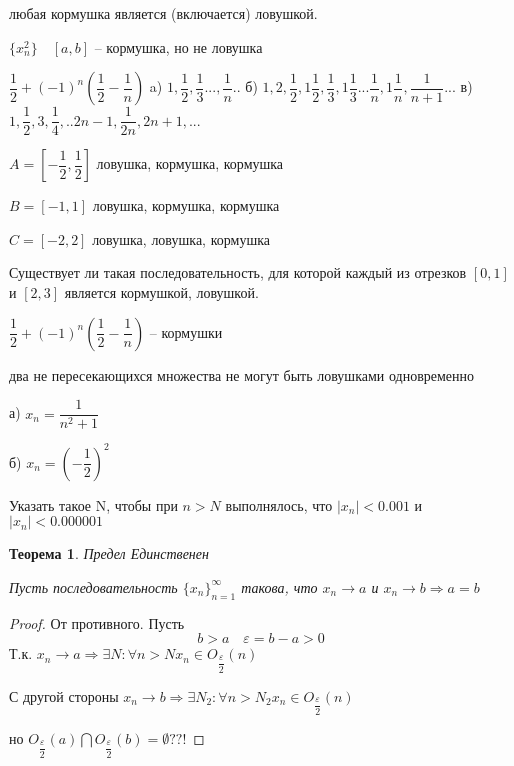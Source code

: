 \documentclass{book}
\newtheorem{Th}{Теорема}[chapter]
\begin{document}
любая кормушка является (включается) ловушкой.

$\{x_n^2\}\quad [a, b]$ -- кормушка, но не ловушка

\noindent
$\dfrac{1}{2} + (-1)^n(\dfrac{1}{2}-\dfrac{1}{n})$
\newline
\newline
a) $1, \dfrac{1}{2}, \dfrac{1}{3} ..., \dfrac{1}{n}	..$
\newline
\newline
б) $1, 2, \dfrac{1}{2}, 1\dfrac{1}{2}, \dfrac{1}{3}, 1\dfrac{1}{3} ... \dfrac{1}{n}, 1\dfrac{1}{n}, \dfrac{1}{n+1}...$
\newline
\newline
в) $1, \dfrac{1}{2}, 3, \dfrac{1}{4}, .. 2n-1, \dfrac{1}{2n}, 2n+1, ...$
\newline
\newline

$A = [-\dfrac{1}{2}, \dfrac{1}{2}]$ ловушка, кормушка, кормушка

$B = [-1, 1]$ ловушка, кормушка, кормушка

$C = [-2, 2]$ ловушка, ловушка, кормушка


Существует ли такая последовательность, для которой каждый из отрезков $[0, 1]$ и $[2, 3]$ является кормушкой, ловушкой.

$\dfrac{1}{2} + (-1)^n(\dfrac{1}{2}-\dfrac{1}{n})$ -- кормушки

два не пересекающихся множества не могут быть ловушками одновременно

а) $x_n = \dfrac{1}{n^2+1}$

б) $x_n = (-\dfrac{1}{2})^2$

Указать такое N, чтобы при $n > N$ выполнялось, что $|x_n|<0.001$ и $|x_n|<0.000001$


\begin{Th}
	Предел Единственен
	
	Пусть последовательность $\{x_n\}_{n=1}^{\infty}$ такова, что $x_n \rightarrow a $ и $x_n \rightarrow b \Rightarrow a = b$ 
\end{Th}

\begin{proof}
	От противного. Пусть $$b>a\quad \varepsilon = b-a>0$$ Т.к. $x_n \rightarrow a \Rightarrow \exists N: \forall n > N x_n \in O_{\dfrac{\varepsilon}{2}}(n)$ 
	
	С другой стороны $x_n \rightarrow b \Rightarrow \exists N_2:\forall n > N_2 x_n \in O_{\dfrac{\varepsilon}{2}}(n)$
		
	но $ O_{\dfrac{\varepsilon}{2}}(a) \bigcap O_{\dfrac{\varepsilon}{2}}(b)= \emptyset ??! $

\end{proof}
\end{document}
